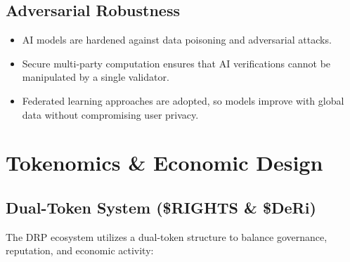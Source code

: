 \documentclass[11pt,a4paper]{article}
\begin{document}
\subsection{Adversarial Robustness}
\begin{itemize}
    \item AI models are hardened against data poisoning and adversarial attacks.
    \item Secure multi-party computation ensures that AI verifications cannot be manipulated by a single validator.
    \item Federated learning approaches are adopted, so models improve with global data without compromising user privacy.
\end{itemize}


\section{Tokenomics \& Economic Design}

\subsection{Dual-Token System (\$RIGHTS \& \$DeRi)}
The DRP ecosystem utilizes a dual-token structure to balance governance, reputation, and economic activity:
\end{document}
